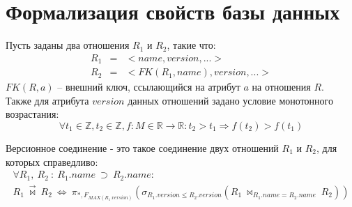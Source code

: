 \section{Формализация свойств базы данных}\label{sec:theorem}
\indent Пусть заданы два отношения $R_1$ и $R_2$, такие что:
\begin{eqnarray*}
	R_1 & = & <name, version, ...> \\
	R_2 & = & <FK(R_1, name), version, ...>
\end{eqnarray*}
\indent $FK(R, a)$ -- внешний ключ, ссылающийся на атрибут $a$ на отношения $R$.\\
\indent Также для атрибута $version$ данных отношений задано условие монотонного возрастания:
\begin{equation}
	\forall t_1 \in \mathbb{Z}, t_2 \in \mathbb{Z}, f: M \in \mathbb{R} \rightarrow \mathbb{R} : t_2 > t_1 \Rightarrow f(t_2) > f(t_1)
\end{equation}

\begin{definition}
	\label{def:join}
	Версионное соединение - это такое соединение двух отношений $R_1$ и $R_2$, для которых справедливо:
	\begin{multline}
		\label{eq:versJoin}
		\forall R_1,\ R_2\ :\ R_1.name\ \supset\ R_2.name:\\
		R_1\ \overrightarrow{\bowtie}\ R_2\ \Leftrightarrow\ \pi_{*, F_{MAX(R_1.version)}}(\sigma_{R_1.version \leq R_2.version}(R_1\ \bowtie_{R_1.name = R_2.name}\ R_2))
	\end{multline}
\end{definition}

